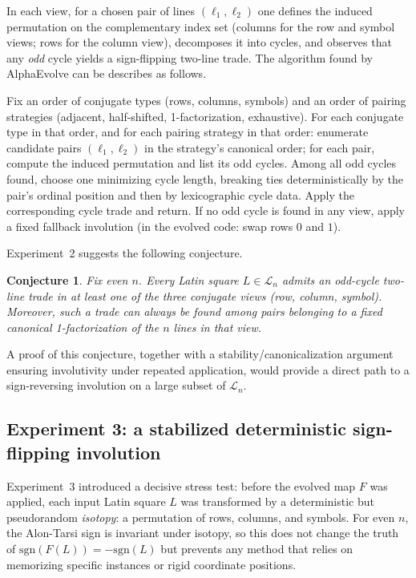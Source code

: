 \documentclass[11pt]{amsart}
\newtheorem{conjecture}{Conjecture}
\newcommand{\sgn}{\mathrm{sgn}}
\begin{document}
In each view, for a chosen pair of lines $(\ell_1,\ell_2)$ one defines the induced permutation on the complementary index set (columns for the row and symbol views; rows for the column view), decomposes it into cycles, and observes that any \emph{odd} cycle yields a sign-flipping two-line trade. The algorithm found by AlphaEvolve can be describes as follows. 

Fix an order of conjugate types (rows, columns, symbols) and an order of pairing strategies (adjacent, half-shifted, 1-factorization, exhaustive).
For each conjugate type in that order, and for each pairing strategy in that order:
enumerate candidate pairs $(\ell_1,\ell_2)$ in the strategy's canonical order; for each pair, compute the induced permutation and list its odd cycles.
Among all odd cycles found, choose one minimizing cycle length, breaking ties deterministically by the pair's ordinal position and then by lexicographic cycle data.
Apply the corresponding cycle trade and return.
If no odd cycle is found in any view, apply a fixed fallback involution (in the evolved code: swap rows $0$ and $1$).


Experiment~2 suggests the following conjecture.
\begin{conjecture}
Fix even $n$.  Every Latin square $L\in\mathcal{L}_n$ admits an odd-cycle two-line trade in at least one of the three conjugate views (row, column, symbol).  Moreover, such a trade can always be found among pairs belonging to a fixed canonical 1-factorization of the $n$ lines in that view.
\end{conjecture}

A proof of this conjecture, together with a stability/canonicalization argument ensuring involutivity under repeated application, would provide a direct path to a sign-reversing involution on a large subset of $\mathcal{L}_n$.


\subsection{Experiment 3: a stabilized deterministic sign-flipping involution}
Experiment~3 introduced a decisive stress test: before the evolved map $F$ was applied, each input Latin square $L$ was transformed by a deterministic but pseudorandom \emph{isotopy}:
a permutation of rows, columns, and symbols. For even $n$, the Alon-Tarsi sign is invariant under isotopy, so this does not change the truth of $\sgn(F(L))=-\sgn(L)$ but prevents any method that relies on memorizing specific instances or rigid coordinate positions.
\end{document}
